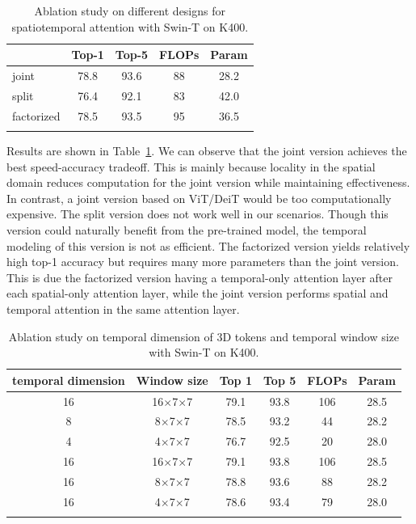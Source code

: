 \documentclass{article}
\begin{document}
\begin{table}[h]
\caption{Ablation study on different designs for spatiotemporal attention with Swin-T on K400.}
\centering
  \begin{tabular}{l|cc|cc}
  \Xhline{1.0pt}
   & Top-1 & Top-5 & FLOPs & Param  \\
  \hline
  joint  & 78.8 & 93.6 & 88 & 28.2 \\
  split & 76.4 & 92.1 & 83 & 42.0 \\
  factorized & 78.5 & 93.5 & 95 & 36.5 \\
  \Xhline{1.0pt}
  \end{tabular}
  \label{tab:variants}
\end{table}

Results are shown in Table~\ref{tab:variants}. We can observe that the joint version achieves the best speed-accuracy tradeoff. This is mainly because locality in the spatial domain reduces computation for the joint version while maintaining effectiveness. In contrast, a joint version based on ViT/DeiT would be too computationally expensive.
The split version does not work well in our scenarios. Though this version could naturally benefit from the pre-trained model, the temporal modeling of this version is not as efficient.
The factorized version yields relatively high top-1 accuracy but requires many more parameters than the joint version. This is due the factorized version having a temporal-only attention layer after each spatial-only attention layer, while the joint version performs spatial and temporal attention in the same attention layer.



\begin{table}[h]
\caption{Ablation study on temporal dimension of 3D tokens and temporal window size with Swin-T on K400.}
\centering
  \begin{tabular}{cc|cc|cc}
  \Xhline{1.0pt}
  temporal dimension & Window size & Top 1 & Top 5 & FLOPs & Param  \\
  \hline
  16 & 16$\times$7$\times$7 & 79.1 & 93.8  & 106 & 28.5 \\
  8 & 8$\times$7$\times$7 & 78.5 & 93.2 & 44 & 28.2 \\
  4 & 4$\times$7$\times$7 & 76.7 & 92.5 & 20 & 28.0 \\
  \hline
  16 & 16$\times$7$\times$7 & 79.1 & 93.8 & 106 & 28.5 \\
  16 & 8$\times$7$\times$7 & 78.8 & 93.6 & 88 & 28.2 \\
  16 & 4$\times$7$\times$7 & 78.6 & 93.4 & 79 & 28.0 \\

  \Xhline{1.0pt}
  \end{tabular}
  \label{tab:frame}
\end{table}
\end{document}
